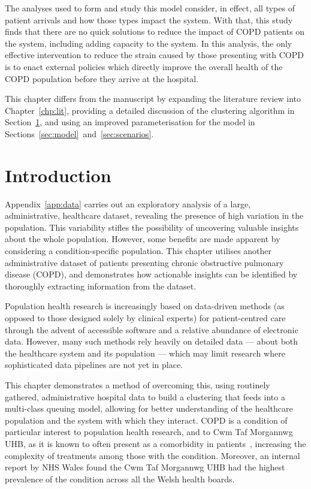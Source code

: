 The analyses used to form and study this model consider, in effect, all types of
patient arrivals and how those types impact the system. With that, this study
finds that there are no quick solutions to reduce the impact of COPD patients on
the system, including adding capacity to the system. In this analysis, the only
effective intervention to reduce the strain caused by those presenting with COPD
is to enact external policies which directly improve the overall health of the
COPD population before they arrive at the hospital.

\myrule%

This chapter differs from the manuscript by expanding the literature review into
Chapter~\ref{chp:lit}, providing a detailed discussion of the clustering
algorithm in Section~\ref{sec:copd:intro}, and using an improved
parameterisation for the model in
Sections~\ref{sec:model}~and~\ref{sec:scenarios}.

\section{Introduction}\label{sec:copd:intro}

Appendix~\ref{app:data} carries out an exploratory analysis of a large,
administrative, healthcare dataset, revealing the presence of high variation in
the population. This variability stifles the possibility of uncovering valuable
insights about the whole population. However, some benefits are made apparent by
considering a condition-specific population. This chapter utilises another
administrative dataset of patients presenting chronic obstructive pulmonary
disease (COPD), and demonstrates how actionable insights can be identified by
thoroughly extracting information from the dataset.

Population health research is increasingly based on data-driven methods (as
opposed to those designed solely by clinical experts) for patient-centred care
through the advent of accessible software and a relative abundance of electronic
data. However, many such methods rely heavily on detailed data — about both the
healthcare system and its population — which may limit research where
sophisticated data pipelines are not yet in place.

This chapter demonstrates a method of overcoming this, using routinely gathered,
administrative hospital data to build a clustering that feeds into a multi-class
queuing model, allowing for better understanding of the healthcare population
and the system with which they interact. COPD is a condition of particular
interest to population health research, and to Cwm Taf Morgannwg UHB, as it is
known to often present as a comorbidity in patients~\cite{Houben2019},
increasing the complexity of treatments among those with the condition.
Moreover, an internal report by NHS Wales found the Cwm Taf Morgannwg UHB had
the highest prevalence of the condition across all the Welsh health boards.


